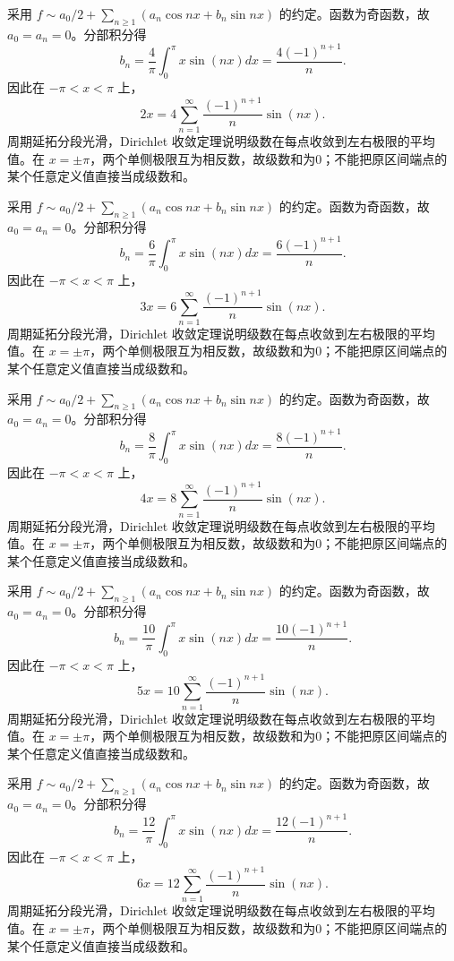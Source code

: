 \documentclass[12pt,fontset=fandol]{ctexart}
\begin{document}
\begin{solve}\label{ans:c28q14}
采用 $f\sim a_0/2+\sum_{n\ge1}(a_n\cos nx+b_n\sin nx)$ 的约定。函数为奇函数，故 $a_0=a_n=0$。分部积分得
\[
b_n=\frac{4}\pi\int_0^\pi x\sin(nx)dx=\frac{4(-1)^{n+1}}n.
\]
因此在 $-\pi<x<\pi$ 上，
\[
2x=4\sum_{n=1}^\infty\frac{(-1)^{n+1}}n\sin(nx).
\]
周期延拓分段光滑，Dirichlet 收敛定理说明级数在每点收敛到左右极限的平均值。在 $x=\pm\pi$，两个单侧极限互为相反数，故级数和为0；不能把原区间端点的某个任意定义值直接当成级数和。
\end{solve}

\begin{solve}\label{ans:c28q15}
采用 $f\sim a_0/2+\sum_{n\ge1}(a_n\cos nx+b_n\sin nx)$ 的约定。函数为奇函数，故 $a_0=a_n=0$。分部积分得
\[
b_n=\frac{6}\pi\int_0^\pi x\sin(nx)dx=\frac{6(-1)^{n+1}}n.
\]
因此在 $-\pi<x<\pi$ 上，
\[
3x=6\sum_{n=1}^\infty\frac{(-1)^{n+1}}n\sin(nx).
\]
周期延拓分段光滑，Dirichlet 收敛定理说明级数在每点收敛到左右极限的平均值。在 $x=\pm\pi$，两个单侧极限互为相反数，故级数和为0；不能把原区间端点的某个任意定义值直接当成级数和。
\end{solve}

\begin{solve}\label{ans:c28q16}
采用 $f\sim a_0/2+\sum_{n\ge1}(a_n\cos nx+b_n\sin nx)$ 的约定。函数为奇函数，故 $a_0=a_n=0$。分部积分得
\[
b_n=\frac{8}\pi\int_0^\pi x\sin(nx)dx=\frac{8(-1)^{n+1}}n.
\]
因此在 $-\pi<x<\pi$ 上，
\[
4x=8\sum_{n=1}^\infty\frac{(-1)^{n+1}}n\sin(nx).
\]
周期延拓分段光滑，Dirichlet 收敛定理说明级数在每点收敛到左右极限的平均值。在 $x=\pm\pi$，两个单侧极限互为相反数，故级数和为0；不能把原区间端点的某个任意定义值直接当成级数和。
\end{solve}

\begin{solve}\label{ans:c28q17}
采用 $f\sim a_0/2+\sum_{n\ge1}(a_n\cos nx+b_n\sin nx)$ 的约定。函数为奇函数，故 $a_0=a_n=0$。分部积分得
\[
b_n=\frac{10}\pi\int_0^\pi x\sin(nx)dx=\frac{10(-1)^{n+1}}n.
\]
因此在 $-\pi<x<\pi$ 上，
\[
5x=10\sum_{n=1}^\infty\frac{(-1)^{n+1}}n\sin(nx).
\]
周期延拓分段光滑，Dirichlet 收敛定理说明级数在每点收敛到左右极限的平均值。在 $x=\pm\pi$，两个单侧极限互为相反数，故级数和为0；不能把原区间端点的某个任意定义值直接当成级数和。
\end{solve}

\begin{solve}\label{ans:c28q18}
采用 $f\sim a_0/2+\sum_{n\ge1}(a_n\cos nx+b_n\sin nx)$ 的约定。函数为奇函数，故 $a_0=a_n=0$。分部积分得
\[
b_n=\frac{12}\pi\int_0^\pi x\sin(nx)dx=\frac{12(-1)^{n+1}}n.
\]
因此在 $-\pi<x<\pi$ 上，
\[
6x=12\sum_{n=1}^\infty\frac{(-1)^{n+1}}n\sin(nx).
\]
周期延拓分段光滑，Dirichlet 收敛定理说明级数在每点收敛到左右极限的平均值。在 $x=\pm\pi$，两个单侧极限互为相反数，故级数和为0；不能把原区间端点的某个任意定义值直接当成级数和。
\end{solve}
\end{document}
